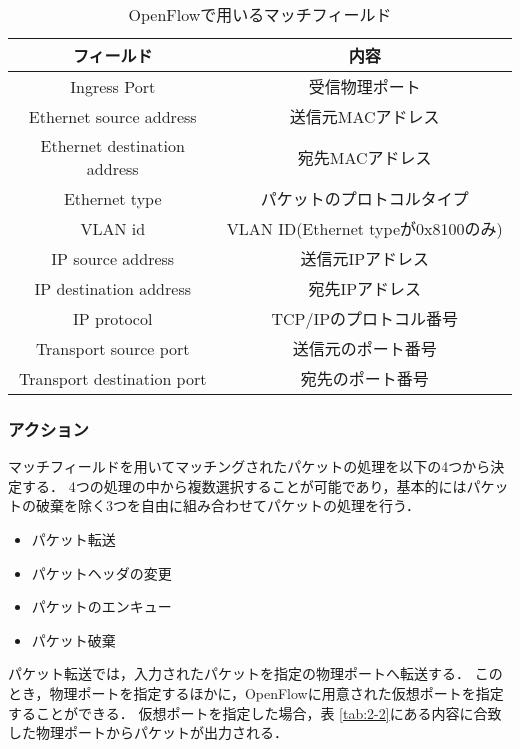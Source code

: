 \begin{table}[bt]
	\begin{center}
		\caption{OpenFlowで用いるマッチフィールド}
		\begin{tabular}{c|c}
			\hline \hline
			フィールド & 内容　\\ \hline
			Ingress Port & 受信物理ポート　\\
			Ethernet source address & 送信元MACアドレス \\
			Ethernet destination address & 宛先MACアドレス　\\
			Ethernet type & パケットのプロトコルタイプ \\
			VLAN id & VLAN ID(Ethernet typeが0x8100のみ)　\\
			IP source address & 送信元IPアドレス　\\
			IP destination address & 宛先IPアドレス　\\
			IP protocol & TCP/IPのプロトコル番号　\\
			Transport source port & 送信元のポート番号　\\
			Transport destination port & 宛先のポート番号\\ \hline
		\end{tabular}
		\label{tab:2-1}
	\end{center}
\end{table}

\subsubsection{アクション}

マッチフィールドを用いてマッチングされたパケットの処理を以下の4つから決定する\cite{openflowjapanese}．
4つの処理の中から複数選択することが可能であり，基本的にはパケットの破棄を除く3つを自由に組み合わせてパケットの処理を行う．

\begin{itemize}
	\item パケット転送
	\item パケットヘッダの変更
	\item パケットのエンキュー
	\item パケット破棄
\end{itemize}

パケット転送では，入力されたパケットを指定の物理ポートへ転送する．
このとき，物理ポートを指定するほかに，OpenFlowに用意された仮想ポートを指定することができる．
仮想ポートを指定した場合，表 \ref{tab:2-2}にある内容に合致した物理ポートからパケットが出力される．

